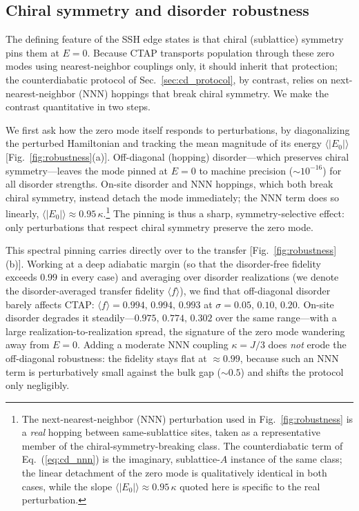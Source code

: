 \documentclass[
  reprint,
  amsmath,
  amssymb,
  aps,
  prb,
  floatfix,
  longbibliography,
]{revtex4-2}
\begin{document}
\subsection{Chiral symmetry and disorder robustness}
\label{sec:robustness}

The defining feature of the SSH edge states is that chiral (sublattice) symmetry
pins them at $E=0$. Because CTAP transports population through these zero modes
using nearest-neighbor couplings only, it should inherit that protection; the
counterdiabatic protocol of Sec.~\ref{sec:cd_protocol}, by contrast, relies on
next-nearest-neighbor (NNN) hoppings that break chiral symmetry. We make the
contrast quantitative in two steps.

We first ask how the zero mode itself responds to perturbations, by diagonalizing
the perturbed Hamiltonian and tracking the mean magnitude of its energy
$\langle|E_0|\rangle$ [Fig.~\ref{fig:robustness}(a)]. Off-diagonal (hopping)
disorder---which preserves chiral symmetry---leaves the mode pinned at $E=0$ to
machine precision ($\sim\!10^{-16}$) for all disorder strengths. On-site disorder
and NNN hoppings, which both break chiral symmetry, instead detach the mode
immediately; the NNN term does so linearly, $\langle|E_0|\rangle\approx
0.95\,\kappa$.\footnote{The next-nearest-neighbor (NNN) perturbation used in Fig.~\ref{fig:robustness} is a \emph{real} hopping between same-sublattice sites, taken as a representative member of the chiral-symmetry-breaking class. The counterdiabatic term of Eq.~(\ref{eq:cd_nnn}) is the imaginary, sublattice-$A$ instance of the same class; the linear detachment of the zero mode is qualitatively identical in both cases, while the slope $\langle|E_0|\rangle\approx0.95\,\kappa$ quoted here is specific to the real perturbation.} The pinning is thus a sharp, symmetry-selective effect: only
perturbations that respect chiral symmetry preserve the zero mode.

This spectral pinning carries directly over to the transfer
[Fig.~\ref{fig:robustness}(b)]. Working at a deep adiabatic margin (so that the
disorder-free fidelity exceeds $0.99$ in every case) and averaging over disorder
realizations (we denote the disorder-averaged transfer fidelity
$\langle f\rangle$), we find that off-diagonal disorder barely affects CTAP:
$\langle f\rangle=0.994,\,0.994,\,0.993$ at $\sigma=0.05,\,0.10,\,0.20$.
On-site disorder degrades it steadily---$0.975,\,0.774,\,0.302$ over the same
range---with a large realization-to-realization spread, the signature of the zero
mode wandering away from $E=0$. Adding a moderate NNN coupling $\kappa=J/3$ does
\emph{not} erode the off-diagonal robustness: the fidelity stays flat at
$\approx0.99$, because such an NNN term is perturbatively small against the bulk
gap ($\sim0.5$) and shifts the protocol only negligibly.
\end{document}
